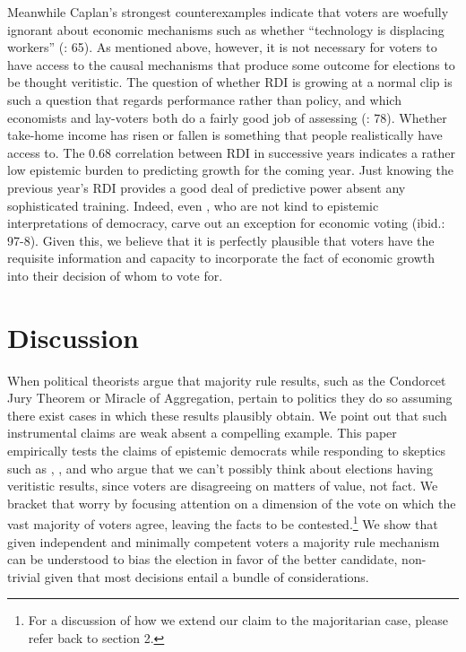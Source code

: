\documentclass[11pt]{article}
\begin{document}
Meanwhile Caplan's strongest counterexamples  indicate that voters are woefully ignorant about economic mechanisms such as whether ``technology is displacing workers'' (\cite{Caplan2006}: 65). As mentioned above, however, it is not necessary for voters to have access to the causal mechanisms that produce some outcome for elections to be thought veritistic. The question of whether RDI is growing at a normal clip is such a question that regards performance rather than policy, and which economists and lay-voters both do a fairly good job of assessing (\cite{Caplan2006}: 78). Whether take-home income has risen or fallen is something that people realistically have access to. The 0.68 correlation between RDI in successive years indicates  a rather low epistemic burden to predicting growth for the coming year. Just knowing the previous year's RDI provides a good deal of predictive power absent any sophisticated training. Indeed, even \cite{achen2016democracy}, who are not kind to epistemic interpretations of democracy, carve out an exception for economic voting (ibid.: 97-8). Given this, we believe that it is perfectly plausible that voters have the requisite information and capacity to incorporate the fact of economic growth into their decision of whom to vote for.


\section{Discussion}

When political  theorists argue that majority rule results, such as the Condorcet Jury Theorem or Miracle of Aggregation, pertain to politics they do so assuming there exist cases in which these results plausibly obtain. We point out that such instrumental claims are weak absent a compelling example.
This paper empirically tests the claims of epistemic democrats while responding to skeptics such as \citet{Anderson2006}, \citet{Ingham2013}, and \cite{urbinati2014democracy} who argue that we can't possibly think about elections having veritistic results, since voters are disagreeing on matters of value, not fact. We bracket that worry by focusing attention on a dimension of the vote on which the vast majority of voters agree, leaving the facts to be contested.\footnote{For a discussion of how we extend our claim to the majoritarian case, please refer back to section 2.}
We show that given independent and minimally competent voters a majority rule mechanism can be understood  to bias the election in favor of the better candidate, non-trivial given that most decisions entail a bundle of considerations.%
\end{document}
